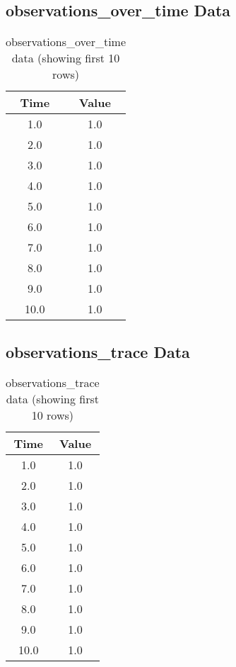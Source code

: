 \documentclass{article}
\begin{document}
\subsection{observations_over_time Data}
\begin{table}[h]
\centering
\begin{tabular}{cc}
\toprule
Time & Value \\
\midrule
1.0 & 1.0 \\
2.0 & 1.0 \\
3.0 & 1.0 \\
4.0 & 1.0 \\
5.0 & 1.0 \\
6.0 & 1.0 \\
7.0 & 1.0 \\
8.0 & 1.0 \\
9.0 & 1.0 \\
10.0 & 1.0 \\
\bottomrule
\end{tabular}
\caption{observations_over_time data (showing first 10 rows)}
\end{table}

\subsection{observations_trace Data}
\begin{table}[h]
\centering
\begin{tabular}{cc}
\toprule
Time & Value \\
\midrule
1.0 & 1.0 \\
2.0 & 1.0 \\
3.0 & 1.0 \\
4.0 & 1.0 \\
5.0 & 1.0 \\
6.0 & 1.0 \\
7.0 & 1.0 \\
8.0 & 1.0 \\
9.0 & 1.0 \\
10.0 & 1.0 \\
\bottomrule
\end{tabular}
\caption{observations_trace data (showing first 10 rows)}
\end{table}
\end{document}
